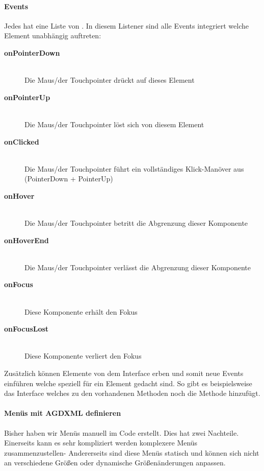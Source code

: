 \paragraph{Events}

Jedes  hat eine Liste von . In diesem Listener sind alle Events integriert welche Element unabhängig auftreten:

\begin{description}
	\item[\textbf{onPointerDown}] \hfill \\  Die Maus/der Touchpointer drückt auf dieses Element
	\item[\textbf{onPointerUp}]   \hfill \\  Die Maus/der Touchpointer löst sich von diesem Element
	\item[\textbf{onClicked}]     \hfill \\  Die Maus/der Touchpointer führt ein vollständiges Klick-Manöver aus (PointerDown + PointerUp)
	\item[\textbf{onHover}]       \hfill \\  Die Maus/der Touchpointer betritt die Abgrenzung dieser Komponente
	\item[\textbf{onHoverEnd}]    \hfill \\  Die Maus/der Touchpointer verlässt die Abgrenzung dieser Komponente
	\item[\textbf{onFocus}]       \hfill \\  Diese Komponente erhält den Fokus
	\item[\textbf{onFocusLost}]   \hfill \\  Diese Komponente verliert den Fokus
\end{description}

Zusätzlich können Elemente von dem Interface  erben und somit neue Events einführen welche speziell für ein Element gedacht sind. So gibt es beispielsweise das Interface  welches zu den vorhandenen Methoden noch die Methode  hinzufügt.

\paragraph{Menüs mit AGDXML definieren}

Bisher haben wir Menüs manuell im Code erstellt. Dies hat zwei Nachteile. Einerseits kann es sehr kompliziert werden komplexere Menüs zusammenzustellen- Andererseits sind diese Menüs statisch und können sich nicht an verschiedene Größen oder dynamische Größenänderungen anpassen.

